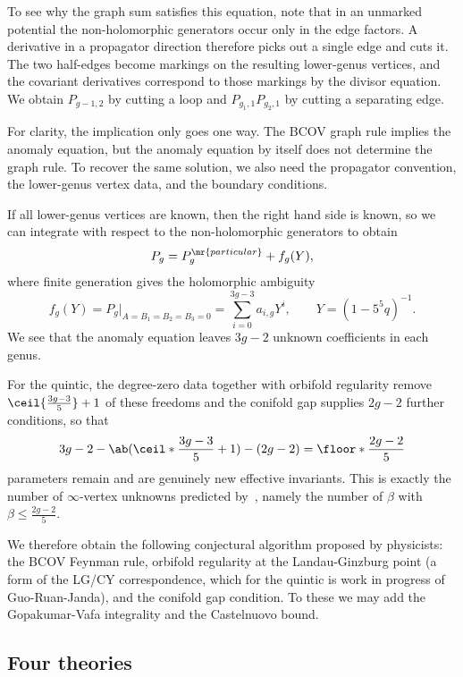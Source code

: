 To see why the graph sum satisfies this equation, note that in an unmarked potential the non-holomorphic generators occur only in the edge factors. A derivative in a propagator direction therefore picks out a single edge and cuts it. The two half-edges become markings on the resulting lower-genus vertices, and the covariant derivatives correspond to those markings by the divisor equation. We obtain \(P_{g-1,2}\) by cutting a loop and \(P_{g_1,1}P_{g_2,1}\) by cutting a separating edge.

\begin{rmk}
    For clarity, the implication only goes one way. The BCOV graph rule implies the anomaly equation, but the anomaly equation by itself does not determine the graph rule. To recover the same solution, we also need the propagator convention, the lower-genus vertex data, and the boundary conditions.
\end{rmk}

If all lower-genus vertices are known, then the right hand side is known, so we can integrate with respect to the non-holomorphic generators to obtain
\[ P_g = P_g^{\mr{particular}} + f_g(Y), \]
where finite generation gives the holomorphic ambiguity
\[ f_g(Y) = P_g|_{A = B_1 = B_2 = B_3 = 0} = \sum_{i=0}^{3g-3}a_{i,g}Y^i, \qquad Y = (1-5^5q)^{-1}. \]
We see that the anomaly equation leaves \(3g-2\) unknown coefficients in each genus.

\begin{rmk}
    For the quintic, the degree-zero data together with orbifold regularity remove \(\ceil{\frac{3g-3}{5}}+1\) of these freedoms and the conifold gap supplies \(2g-2\) further conditions, so that
    \[ 3g-2 - \ab(\ceil*{\frac{3g-3}{5}}+1) - (2g-2) = \floor*{\frac{2g-2}{5}} \]
    parameters remain and are genuinely new effective invariants. This is exactly the number of \(\infty\)-vertex unknowns predicted by~, namely the number of \(\beta\) with \(\beta \leq \frac{2g-2}{5}\).
\end{rmk}

We therefore obtain the following conjectural algorithm proposed by physicists: the BCOV Feynman rule, orbifold regularity at the Landau-Ginzburg point (a form of the LG/CY correspondence, which for the quintic is work in progress of Guo-Ruan-Janda), and the conifold gap condition. To these we may add the Gopakumar-Vafa integrality and the Castelnuovo bound.

\subsection{Four theories}%
\label{sub:Four theories}

